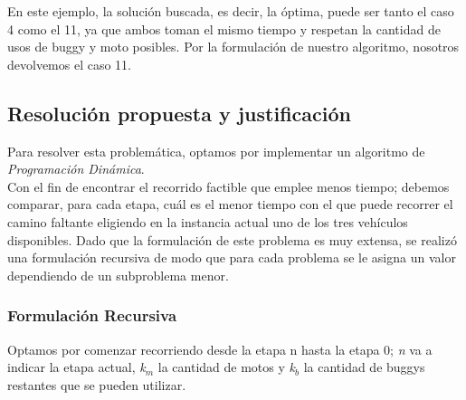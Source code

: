 En este ejemplo, la soluci\'on buscada, es decir, la \'optima, puede ser tanto el caso 4 como el 11, ya que ambos toman el mismo tiempo y respetan la cantidad de usos de buggy y moto posibles.
Por la formulaci\'on de nuestro algoritmo, nosotros devolvemos el caso 11.

\newpage
\subsection{Resoluci\'on propuesta y justificaci\'on}

Para resolver esta problem\'atica, optamos por implementar un algoritmo de \emph{Programaci\'on Din\'amica}.\\

Con el fin de encontrar el recorrido factible que emplee menos tiempo; debemos comparar, para cada etapa, cu\'al es el menor tiempo con el que puede recorrer el camino faltante eligiendo en la instancia actual uno de los tres veh\'iculos disponibles. Dado que la formulaci\'on de este problema es muy extensa, se realiz\'o una formulaci\'on recursiva de modo que para cada problema se le asigna un valor dependiendo de un subproblema menor. 

\subsubsection*{Formulaci\'on Recursiva}

Optamos por comenzar recorriendo desde la etapa n hasta la etapa 0; \emph{n} va a indicar la etapa actual, \emph{k$_m$} la cantidad de motos y \emph{k$_b$} la cantidad de buggys restantes que se pueden utilizar.

